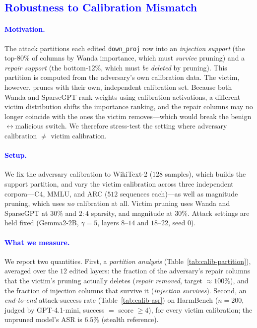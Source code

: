 {\color{blue}   %
\subsection{\textcolor{blue}{Robustness to Calibration Mismatch}}
\label{sec:calibration}

\paragraph{\textcolor{blue}{Motivation.}}
The attack partitions each edited \texttt{down\_proj} row into an \emph{injection support}
(the top-$80\%$ of columns by Wanda importance, which must \emph{survive} pruning) and a
\emph{repair support} (the bottom-$12\%$, which must \emph{be deleted} by pruning). This partition
is computed from the adversary's own calibration data. The victim, however, prunes with their own,
independent calibration set. Because both Wanda and SparseGPT rank weights using calibration
activations, a different victim distribution shifts the importance ranking, and the repair columns
may no longer coincide with the ones the victim removes---which would break the benign$\leftrightarrow$malicious
switch. We therefore stress-test the setting where adversary calibration $\neq$ victim calibration.

\paragraph{\textcolor{blue}{Setup.}}
We fix the adversary calibration to WikiText-2 ($128$ samples), which builds the support partition,
and vary the victim calibration across three independent corpora---C4, MMLU, and ARC ($512$ sequences
each)---as well as magnitude pruning, which uses \emph{no} calibration at all. Victim pruning uses
Wanda and SparseGPT at $30\%$ and $2{:}4$ sparsity, and magnitude at $30\%$. Attack settings are held
fixed (Gemma2-2B, $\gamma{=}5$, layers $8$--$14$ and $18$--$22$, seed $0$).

\paragraph{\textcolor{blue}{What we measure.}}
We report two quantities. First, a \emph{partition analysis} (Table~\ref{tab:calib-partition}),
averaged over the $12$ edited layers: the fraction of the adversary's repair columns that the victim's
pruning actually deletes (\emph{repair removed}, target $\approx 100\%$), and the fraction of injection
columns that survive it (\emph{injection survives}). Second, an \emph{end-to-end} attack-success rate
(Table~\ref{tab:calib-asr}) on HarmBench ($n{=}200$, judged by GPT-4.1-mini, success $=$ score $\geq 4$),
for every victim calibration; the unpruned model's ASR is $6.5\%$ (stealth reference).

}
